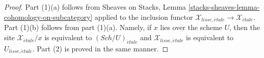 \documentclass[10pt,a4paper]{amsart}
\theoremstyle{plain}
\theoremstyle{definition}
\theoremstyle{remark}
\numberwithin{equation}{subsection}
\def\Sch{\mathit{Sch}}
\def\etale{{\acute{e}tale}}
\begin{document}
\begin{proof}
Part (1)(a) follows from Sheaves on Stacks, Lemma
\ref{stacks-sheaves-lemma-cohomology-on-subcategory} applied to the inclusion
functor $\mathcal{X}_{lisse,\etale} \to \mathcal{X}_\etale$.
Part (1)(b) follows from part (1)(a). Namely, if $x$ lies over the
scheme $U$, then the site $\mathcal{X}_\etale/x$ is equivalent
to $(\Sch/U)_\etale$ and $\mathcal{X}_{lisse,\etale}$ is equivalent
to $U_{lisse,\etale}$. Part (2) is proved in the same manner.
\end{proof}
\end{document}
